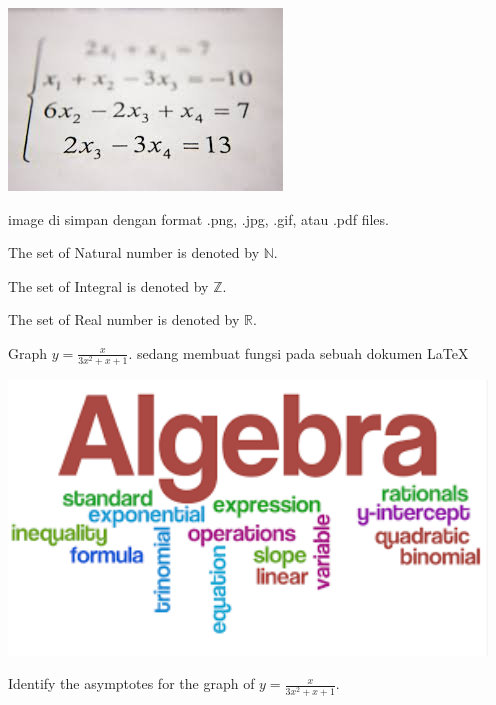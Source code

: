 \documentclass[11pt]{article}
\def\eq1{y=\frac{x}{3x^2+x+1}}
\def\labelaxes{sedang membuat fungsi pada sebuah dokumen \LaTeX}
\begin{document}
	
	\begin{center}
	\includegraphics[scale=0.5]{1.jpg}
	
	image di simpan dengan format .png, .jpg, .gif, atau .pdf files.
	\end{center}
	
	The set of Natural number is denoted by $\mathbb{N}$.
	
	The set of Integral is denoted by $\mathbb{Z}$.
	
	The set of Real number is denoted by $\mathbb{R}$.
	
	Graph $\eq1$. \labelaxes
	
	\includegraphics[width=5in]{2.png}
	
	Identify the asymptotes for the graph of $\eq1$.
	
\end{document}
